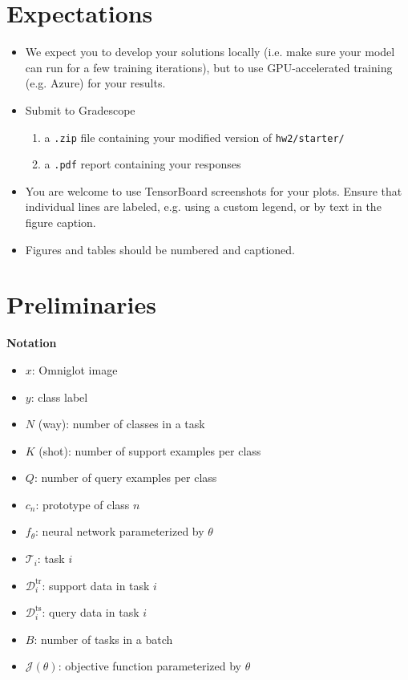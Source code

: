 \documentclass[12pt]{article}
\newcommand{\task}{\mathcal{T}}
\newcommand{\supportdata}{\mathcal{D}^\mathrm{tr}}
\newcommand{\querydata}{\mathcal{D}^\mathrm{ts}}
\begin{document}
    \section*{Expectations}
    \begin{itemize}
        \item We expect you to develop your solutions locally (i.e. make sure your model can run for a few training iterations), but to use GPU-accelerated training (e.g. Azure) for your results.
        \item Submit to Gradescope
        \begin{enumerate}
            \item a \texttt{.zip} file containing your modified version of \texttt{hw2/starter/}
            \item a \texttt{.pdf} report containing your responses
        \end{enumerate}
        \item You are welcome to use TensorBoard screenshots for your plots. Ensure that individual lines are labeled, e.g. using a custom legend, or by text in the figure caption.
        \item Figures and tables should be numbered and captioned.
    \end{itemize}


    \newpage
    \section*{Preliminaries}
    \textbf{Notation}
    \begin{itemize}
        \item $x$: Omniglot image
        \item $y$: class label
        \item $N$ (way): number of classes in a task
        \item $K$ (shot): number of support examples per class
        \item $Q$: number of query examples per class
        \item $c_n$: prototype of class $n$
        \item $f_\theta$: neural network parameterized by $\theta$
        \item $\task_i$: task $i$
        \item $\supportdata_i$: support data in task $i$
        \item $\querydata_i$: query data in task $i$
        \item $B$: number of tasks in a batch
        \item $\mathcal{J}(\theta)$: objective function parameterized by $\theta$
    \end{itemize}
\end{document}
